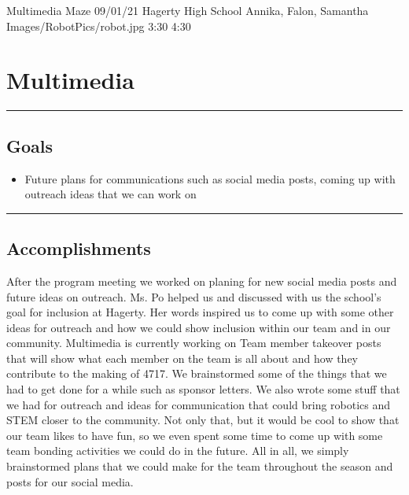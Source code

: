 \insertmeeting 
	{Multimedia Maze} 
	{09/01/21}
	{Hagerty High School}
	{Annika, Falon, Samantha}
	{Images/RobotPics/robot.jpg}
	{3:30}
      {4:30}
	
\section*{Multimedia}
\noindent\hfil\rule{\textwidth}{.4pt}\hfil
\subsection*{Goals}
\begin{itemize}
    \item Future plans for communications such as social media posts, coming up with outreach ideas that we can work on

\end{itemize} 

\noindent\hfil\rule{\textwidth}{.4pt}\hfil

\subsection*{Accomplishments}
After the program meeting we worked on planing for new social media posts and future ideas on outreach. Ms. Po helped us and discussed with us the school’s goal for inclusion at Hagerty. Her words inspired us to come up with some other ideas for outreach and how we could show inclusion within our team and in our community. Multimedia is currently working on Team member takeover posts that will show what each member on the team is all about and how they contribute to the making of 4717. We brainstormed some of the things that we had to get done for a while such as sponsor letters. We also wrote some stuff that we had for outreach and ideas for communication that could bring robotics and STEM closer to the community. Not only that, but it would be cool to show that our team likes to have fun, so we even spent some time to come up with some team bonding activities we could do in the future. All in all, we simply brainstormed plans that we could make for the team throughout the season and posts for our social media. 
 

